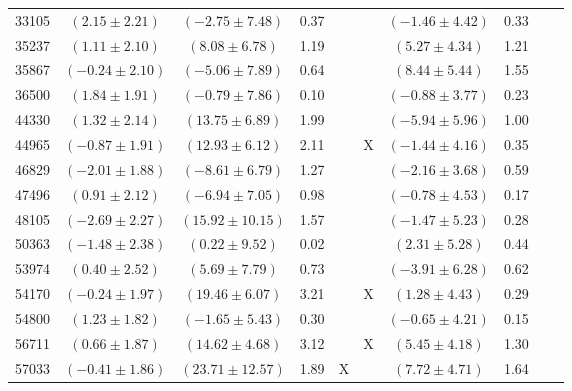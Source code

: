 \documentclass [10pt, twoside] {uwthesis}[2012/04/02]
\begin{document}
{\begin{longtable}[t]{|c|c|cccc|cccc|}
33105	&  $(	2.15	  \pm  	2.21	)$  &  $(	-2.75	  \pm  	7.48	)$  &  	0.37	  &  		  &  		  &  $(	-1.46	  \pm  	4.42	)$  &  	0.33	  &  		  &  		  \\
35237	&  $(	1.11	  \pm  	2.10	)$  &  $(	8.08	  \pm  	6.78	)$  &  	1.19	  &  		  &  		  &  $(	5.27	  \pm  	4.34	)$  &  	1.21	  &  		  &  		  \\
35867	&  $(	-0.24	  \pm  	2.10	)$  &  $(	-5.06	  \pm  	7.89	)$  &  	0.64	  &  		  &  		  &  $(	8.44	  \pm  	5.44	)$  &  	1.55	  &  		  &  		  \\
36500	&  $(	1.84	  \pm  	1.91	)$  &  $(	-0.79	  \pm  	7.86	)$  &  	0.10	  &  		  &  		  &  $(	-0.88	  \pm  	3.77	)$  &  	0.23	  &  		  &  		  \\
44330	&  $(	1.32	  \pm  	2.14	)$  &  $(	13.75	  \pm  	6.89	)$  &  	1.99	  &  		  &  		  &  $(	-5.94	  \pm  	5.96	)$  &  	1.00	  &  		  &  		  \\
44965	&  $(	-0.87	  \pm  	1.91	)$  &  $(	12.93	  \pm  	6.12	)$  &  	2.11	  &  		  &  	X	  &  $(	-1.44	  \pm  	4.16	)$  &  	0.35	  &  		  &  		  \\
46829	&  $(	-2.01	  \pm  	1.88	)$  &  $(	-8.61	  \pm  	6.79	)$  &  	1.27	  &  		  &  		  &  $(	-2.16	  \pm  	3.68	)$  &  	0.59	  &  		  &  		  \\
47496	&  $(	0.91	  \pm  	2.12	)$  &  $(	-6.94	  \pm  	7.05	)$  &  	0.98	  &  		  &  		  &  $(	-0.78	  \pm  	4.53	)$  &  	0.17	  &  		  &  		  \\
48105	&  $(	-2.69	  \pm  	2.27	)$  &  $(	15.92	  \pm  	10.15	)$  &  	1.57	  &  		  &  		  &  $(	-1.47	  \pm  	5.23	)$  &  	0.28	  &  		  &  		  \\
50363	&  $(	-1.48	  \pm  	2.38	)$  &  $(	0.22	  \pm  	9.52	)$  &  	0.02	  &  		  &  		  &  $(	2.31	  \pm  	5.28	)$  &  	0.44	  &  		  &  		  \\
53974	&  $(	0.40	  \pm  	2.52	)$  &  $(	5.69	  \pm  	7.79	)$  &  	0.73	  &  		  &  		  &  $(	-3.91	  \pm  	6.28	)$  &  	0.62	  &  		  &  		  \\
54170	&  $(	-0.24	  \pm  	1.97	)$  &  $(	19.46	  \pm  	6.07	)$  &  	3.21	  &  		  &  	X	  &  $(	1.28	  \pm  	4.43	)$  &  	0.29	  &  		  &  		  \\
54800	&  $(	1.23	  \pm  	1.82	)$  &  $(	-1.65	  \pm  	5.43	)$  &  	0.30	  &  		  &  		  &  $(	-0.65	  \pm  	4.21	)$  &  	0.15	  &  		  &  		  \\
56711	&  $(	0.66	  \pm  	1.87	)$  &  $(	14.62	  \pm  	4.68	)$  &  	3.12	  &  		  &  	X	  &  $(	5.45	  \pm  	4.18	)$  &  	1.30	  &  		  &  		  \\
57033	&  $(	-0.41	  \pm  	1.86	)$  &  $(	23.71	  \pm  	12.57	)$  &  	1.89	  &  	X	  &  		  &  $(	7.72	  \pm  	4.71	)$  &  	1.64	  &  		  &  		  \\ \hline

\end{longtable}}
\end{document}

